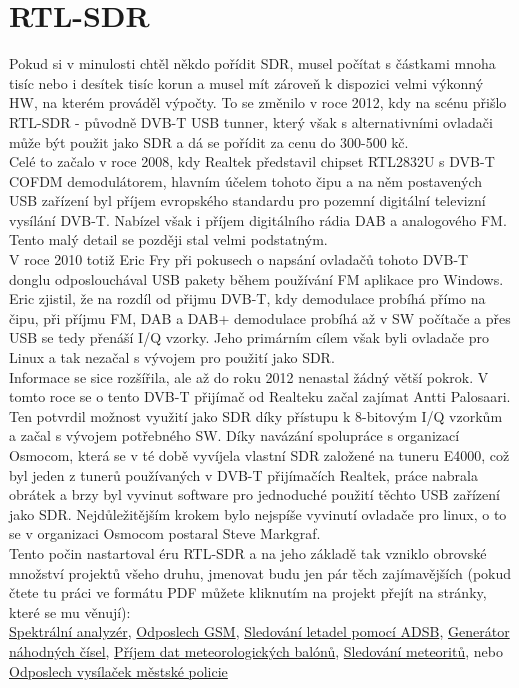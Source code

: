 \documentclass{ctuthesis}
\begin{document}
\section{RTL-SDR}
Pokud si v minulosti chtěl někdo pořídit SDR, musel počítat s částkami mnoha tisíc nebo i desítek tisíc korun a musel mít zároveň k dispozici velmi výkonný HW, na kterém prováděl výpočty. To se změnilo v roce 2012, kdy na scénu přišlo RTL-SDR - původně DVB-T USB tunner, který však s alternativními ovladači může být použit jako SDR a dá se pořídit za cenu do 300-500 kč.\\
Celé to začalo v roce 2008, kdy Realtek představil chipset RTL2832U s  DVB-T COFDM demodulátorem, hlavním účelem tohoto čipu a na něm postavených USB zařízení byl příjem evropského standardu pro pozemní digitální televizní vysílání DVB-T. Nabízel však i příjem digitálního rádia DAB a analogového FM. Tento malý detail se později stal velmi podstatným.\\
V roce 2010 totiž Eric Fry při pokusech o napsání ovladačů tohoto DVB-T donglu odposlouchával USB pakety během používání FM aplikace pro Windows. Eric zjistil, že na rozdíl od přijmu DVB-T, kdy demodulace probíhá přímo na čipu, při příjmu FM, DAB a DAB+ demodulace probíhá až v SW počítače a přes USB se tedy přenáší I/Q vzorky. Jeho primárním cílem však byli ovladače pro Linux a tak nezačal s vývojem pro použití jako SDR.\\
Informace se sice rozšířila, ale až do roku 2012 nenastal žádný větší pokrok. V tomto roce se o tento DVB-T přijímač od Realteku začal zajímat Antti Palosaari. Ten potvrdil možnost využití jako SDR díky přístupu k 8-bitovým I/Q vzorkům a začal s vývojem potřebného SW. Díky navázání spolupráce s organizací Osmocom, která se v té době vyvíjela vlastní SDR založené na tuneru E4000, což byl jeden z tunerů používaných v DVB-T přijímačích Realtek, práce nabrala obrátek a brzy byl vyvinut software pro jednoduché použití těchto USB zařízení jako SDR. Nejdůležitějším krokem bylo nejspíše vyvinutí ovladače pro linux, o to se v organizaci Osmocom postaral Steve Markgraf.
\cite{rtlhistory2016}
\cite{rtlhistory2018}
\\
Tento počin nastartoval éru RTL-SDR a na jeho základě tak vzniklo obrovské množství projektů všeho druhu, jmenovat budu jen pár těch zajímavějších (pokud čtete tu práci ve formátu PDF můžete kliknutím na projekt přejít na stránky, které se mu věnují):\\ \href{https://www.rtl-sdr.com/rtl-sdr-used-as-a-spectrum-analyzer/}{Spektrální analyzér}, \href{https://www.rtl-sdr.com/rtl-sdr-tutorial-analyzing-gsm-with-airprobe-and-wireshark/}{Odposlech GSM}, \href{https://www.rtl-sdr.com/adsb-aircraft-radar-with-rtl-sdr/}{Sledování letadel pomocí ADSB}, \href{https://www.rtl-sdr.com/using-rtl-sdr-cheap-entropy-source/}{Generátor náhodných čísel}, \href{https://www.rtl-sdr.com/receiving-weather-balloon-data-with-rtl-sdr/}{Příjem dat meteorologických balónů}, \href{https://www.rtl-sdr.com/meteor-reflection-observations-with-rtl-sdr/}{Sledování meteoritů}, nebo \href{https://technet.idnes.cz/odposlech-site-tetra-a-mestske-policie-dhy-/tec_technika.aspx?c=A160913_145939_tec_technika_vse}{Odposlech vysílaček městské policie}\\
\end{document}
